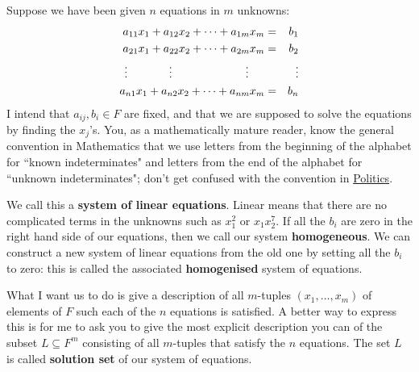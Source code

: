 \documentclass[11pt]{amsbook}
\theoremstyle{definition}
\begin{document}
Suppose we have been given $n$ equations in $m$ unknowns:
\begin{eqnarray*}
      a_{11} x_1 + a_{12}x_2 +  \cdots  + a_{1m}x_m & =  & b_1 \\
      a_{21} x_1 + a_{22}x_2 +  \cdots  + a_{2m}x_m & = & b_2 \\
      \vdots  \hspace{13mm} \vdots \hspace{23mm} \vdots \hspace{5mm} &&  \, \vdots \\
      a_{n1} x_1 + a_{n2}x_2 + \cdots  + a_{nm}x_m & =  & b_n
\end{eqnarray*}
I intend that $a_{ij}, b_i \in F$ are fixed, and that we are supposed to solve the equations by finding the $x_j$'s. You, as a mathematically mature reader, know the general convention in Mathematics that we use letters from the beginning of the alphabet for ``known indeterminates" and letters from the end of the alphabet for ``unknown indeterminates"; don't get confused with the convention in \href{http://en.wikipedia.org/wiki/There_are_known_knowns}{Politics}.

We call this a {\bf system of linear equations}. Linear means that there are no complicated terms in the unknowns such as $x_1^2$ or $x_1x_2^7$. If all the $b_i$ are zero in the right hand side of our equations, then we call our system {\bf homogeneous}. We can construct a new system of linear equations from the old one by setting all the $b_i$ to zero: this is called the associated {\bf homogenised} system of equations.

What I want us to do is give a description of all $m$-tuples $(x_1, \ldots , x_m)$ of elements of $F$ such each of the $n$ equations is satisfied. A better way to express this is for me to ask you to give the most explicit description you can of the subset $L \subseteq F^m$ consisting of all $m$-tuples that satisfy the $n$ equations. The set $L$ is called {\bf solution set} of our system of equations.
\end{document}
